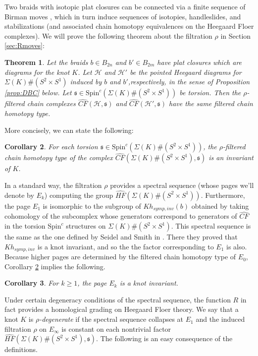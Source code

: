 \documentclass[11pt]{article}
\theoremstyle{plain} \newtheorem{thm}{Theorem}[subsection]
\theoremstyle{plain} \newtheorem{cor}[thm]{Corollary}
\theoremstyle{plain} \newtheorem{prop}[thm]{Proposition}
\theoremstyle{plain} \newtheorem{conj}[thm]{Conjecture}
\theoremstyle{plain} \newtheorem{lem}[thm]{Lemma}
\theoremstyle{definition} \newtheorem{df}[thm]{Definition}
\theoremstyle{remark} \newtheorem{rmk}[thm]{Remark}
\theoremstyle{remark} \newtheorem{obs}[thm]{Observation}
\newcommand{\DBCs}[1]{\Sigma(#1)\#(S^{2}\times S^{1})}
\newcommand{\h}{\mathcal{H}}
\newcommand{\HFx}[1]{\widehat{HF}(\DBCs{#1})}
\newcommand{\CFxs}[1]{\widehat{CF}(\DBCs{#1}, \mathfrak{s})}
\newcommand{\HFxs}[1]{\widehat{HF}(\DBCs{#1}, \mathfrak{s})}
\newcommand{\Kst}[1]{Kh_{symp,inv}(#1)}
\begin{document}
Two braids with isotopic plat closures can be connected via a finite sequence of Birman moves \cite{bir:moves}, which in turn induce sequences of isotopies, handleslides, and stabilizations (and associated chain homotopy equivalences on the Heegaard Floer complexes).  We will prove the following theorem about the filtration $\rho$ in Section \ref{sec:Rmoves}:

\begin{thm}\label{thm:Rthm}
Let the braids $b \in B_{2n}$ and $b' \in B_{2m}$ have plat closures which are diagrams for the knot $K$.  Let $\h$ and $\h'$ be the pointed Heegaard diagrams for $\DBCs{K}$ induced by $b$ and $b'$,respectively, in the sense of Proposition \ref{prop:DBC} below.  Let $\mathfrak{s} \in \text{Spin}^{c}(\DBCs{K})$ be torsion.  Then the $\rho$-filtered chain complexes $\widehat{CF}(\h, \mathfrak{s})$ and $\widehat{CF}(\h', \mathfrak{s})$ have the same filtered chain homotopy type.
\end{thm}

More concisely, we can state the following:

\begin{cor}\label{cor:Rcor}
For each torsion $\mathfrak{s} \in \text{Spin}^{c}(\DBCs{K})$, the $\rho$-filtered chain homotopy type of the complex $\CFxs{K}$ is an invariant of $K$.
\end{cor}

In a standard way, the filtration $\rho$ provides a spectral sequence (whose pages we'll denote by $E_{k}$) computing the group $\HFx{K}$.  Furthermore, the page $E_{1}$ is isomorphic to the subgroup of $\Kst{b}$ obtained by taking cohomology of the subcomplex whose generators correspond to generators of $\widehat{CF}$ in the torsion $\text{Spin}^{c}$ structures on $\DBCs{K}$.  This spectral sequence is the same as the one defined by Seidel and Smith in \cite{ss:R2}.  There they proved that $Kh_{symp,inv}$ is a knot invariant, and so the the factor corresponding to $E_{1}$ is also.  Because higher pages are determined by the filtered chain homotopy type of $E_{0}$, Corollary \ref{cor:Rcor} implies the following.

\begin{cor}\label{cor:Rss}
For $k \geq 1$, the page $E_{k}$ is a knot invariant.
\end{cor}

Under certain degeneracy conditions of the spectral sequence, the function $R$ in fact provides a homological grading on Heegaard Floer theory.  We say that a knot $K$ is \textit{$\rho$-degenerate} if the spectral sequence collapses at $E_{1}$ and the induced filtration $\rho$ on $E_{\infty}$ is constant on each nontrivial factor $\HFxs{K}$.  The following is an easy consequence of the definitions.
\end{document}
